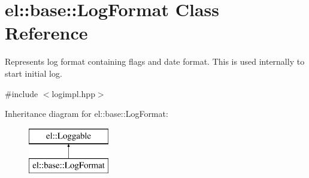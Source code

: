 \hypertarget{classel_1_1base_1_1LogFormat}{\section{el\-:\-:base\-:\-:Log\-Format Class Reference}
\label{classel_1_1base_1_1LogFormat}
}


Represents log format containing flags and date format. This is used internally to start initial log.  




{\ttfamily \#include $<$logimpl.\-hpp$>$}

Inheritance diagram for el\-:\-:base\-:\-:Log\-Format\-:\begin{figure}[H]
\begin{center}
\leavevmode
\includegraphics[height=2.000000cm]{classel_1_1base_1_1LogFormat}
\end{center}
\end{figure}
